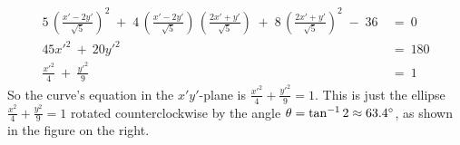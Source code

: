 \begin{exmp}
\begin{align*}
5\,\left(\frac{x' - 2y'}{\sqrt{5}}\right)^2 \;+\;
4\,\left(\frac{x' - 2y'}{\sqrt{5}}\right)\,\left(\frac{2x' + y'}{\sqrt{5}}\right) \;+\;
8\,\left(\frac{2x' + y'}{\sqrt{5}}\right)^2 \;-\; 36 ~&=~ 0\\
45x'^2 ~+~ 20y'^2 ~&=~ 180\\
\frac{x'^2}{4} ~+~ \frac{y'^2}{9} ~&=~ 1
\end{align*}
So the curve's equation in the $x'y'$-plane is
$\frac{x'^2}{4}+\frac{y'^2}{9}=1$. This is just the ellipse
$\frac{x^2}{4}+\frac{y^2}{9}=1$ rotated counterclockwise by the angle
$\theta = \tan^{-1}2 \approx 63.4^\circ$, as shown in the figure on the right.
\end{exmp}
\divider
\vspace{2mm}
\startexercises\label{sec7dot4}
